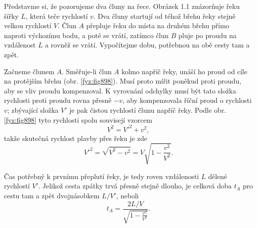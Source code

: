 \begin{mdframed}[style=mdexam]
  \begin{example}\label{fyz:fey_exam015}
    Představme si, že pozorujeme dva čluny na řece. Obrázek 1.1 znázorňuje řeku šířky \(L\), která
    teče rychlostí \(v\). Dva čluny startují od téhož břehu řeky stejně velkou rychlostí \(V\). Člun
    \(A\) přepluje řeku do místa na druhém břehu přímo naproti výchozímu bodu, a poté se vrátí,
    zatímco člun \(B\) pluje po proudu na vzdálenost \(L\) a rovněž se vrátí. Vypočítejme dobu,
    potřebnou na obě cesty tam a zpět. \newline

    {\centering\captionsetup{type=figure}\par}

    \vspace{1em}
    Začneme člunem \(A\). Směřuje-li člun \(A\) kolmo napříč řeky, unáší ho proud od cíle na
    protějším břehu (obr. \ref{fyz:fig898}). Musí proto mířit poněkud proti proudu, aby se vliv
    proudu kompenzoval. K vyrovnání odchylky musí být tato složka rychlosti proti proudu rovna
    přesně \(-v\), aby kompenzovala říční proud o rychlosti \(v\); zbývající složka \(V'\) je pak
    čistou rychlostí člunu napříč řeky. Podle obr. \ref{fyz:fig898} tyto rychlosti spolu souvisejí
    vzorcem
    \begin{equation*}
      V^2 = V'^2 + v^2,
    \end{equation*}
    takže skutečná rychlost plavby přes řeku je zde
    \begin{equation*}
      V'^2 = \sqrt{V^2 - v^2} = V\sqrt{1 - \frac{v^2}{V^2}}.
    \end{equation*}

    {\centering
    \captionsetup{type=figure}
    \par}
    \vspace{1em}
    Čas potřebný k prvnímu přeplutí řeky, je tedy roven vzdálenosti \(L\) dělené rychlostí \(V'\).
    Jelikož cesta zpátky trvá přesně stejně dlouho, je celková doba \(t_A\) pro cestu tam a zpět
    dvojnásobkem \(L/V'\), neboli 
    \begin{equation*}
      t_A = \frac{2L/V}{\sqrt{1 - \frac{v^2}{V^2}}}.
    \end{equation*}


\end{example}
\end{mdframed}
